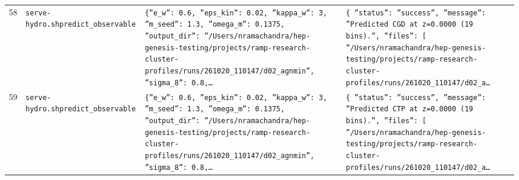 \documentclass[11pt,a4paper]{article}
\begin{document}
\begin{longtable}{@{}p{}p{}p{}p{}@{}}
58 & \texttt{serve-hydro.sh}\newline\texttt{predict\_\allowbreak{}observable} & \texttt{\{''e\_\allowbreak{}w'':\allowbreak{} 0.6,\allowbreak{} ''eps\_\allowbreak{}kin'':\allowbreak{} 0.02,\allowbreak{} ''kappa\_\allowbreak{}w'':\allowbreak{} 3,\allowbreak{} ''m\_\allowbreak{}seed'':\allowbreak{} 1.3,\allowbreak{} ''omega\_\allowbreak{}m'':\allowbreak{} 0.1375,\allowbreak{} ''output\_\allowbreak{}dir'':\allowbreak{} ''/\allowbreak{}Users/\allowbreak{}nramachandra/\allowbreak{}hep-genesis-testing/\allowbreak{}projects/\allowbreak{}ramp-research-cluster-profiles/\allowbreak{}runs/\allowbreak{}261020\_\allowbreak{}110147/\allowbreak{}d02\_\allowbreak{}agnmin'',\allowbreak{} ''sigma\_\allowbreak{}8'':\allowbreak{} 0.8,\allowbreak{}\ldots{}\allowbreak{}} & \texttt{\{   ''status'':\allowbreak{} ''success'',\allowbreak{}   ''message'':\allowbreak{} ''Predicted CGD at z=\allowbreak{}0.0000 (19 bins)\allowbreak{}.'',\allowbreak{}   ''files'':\allowbreak{} [     ''/\allowbreak{}Users/\allowbreak{}nramachandra/\allowbreak{}hep-genesis-testing/\allowbreak{}projects/\allowbreak{}ramp-research-cluster-profiles/\allowbreak{}runs/\allowbreak{}261020\_\allowbreak{}110147/\allowbreak{}d02\_\allowbreak{}a\ldots{}\allowbreak{}} \\
59 & \texttt{serve-hydro.sh}\newline\texttt{predict\_\allowbreak{}observable} & \texttt{\{''e\_\allowbreak{}w'':\allowbreak{} 0.6,\allowbreak{} ''eps\_\allowbreak{}kin'':\allowbreak{} 0.02,\allowbreak{} ''kappa\_\allowbreak{}w'':\allowbreak{} 3,\allowbreak{} ''m\_\allowbreak{}seed'':\allowbreak{} 1.3,\allowbreak{} ''omega\_\allowbreak{}m'':\allowbreak{} 0.1375,\allowbreak{} ''output\_\allowbreak{}dir'':\allowbreak{} ''/\allowbreak{}Users/\allowbreak{}nramachandra/\allowbreak{}hep-genesis-testing/\allowbreak{}projects/\allowbreak{}ramp-research-cluster-profiles/\allowbreak{}runs/\allowbreak{}261020\_\allowbreak{}110147/\allowbreak{}d02\_\allowbreak{}agnmin'',\allowbreak{} ''sigma\_\allowbreak{}8'':\allowbreak{} 0.8,\allowbreak{}\ldots{}\allowbreak{}} & \texttt{\{   ''status'':\allowbreak{} ''success'',\allowbreak{}   ''message'':\allowbreak{} ''Predicted CTP at z=\allowbreak{}0.0000 (19 bins)\allowbreak{}.'',\allowbreak{}   ''files'':\allowbreak{} [     ''/\allowbreak{}Users/\allowbreak{}nramachandra/\allowbreak{}hep-genesis-testing/\allowbreak{}projects/\allowbreak{}ramp-research-cluster-profiles/\allowbreak{}runs/\allowbreak{}261020\_\allowbreak{}110147/\allowbreak{}d02\_\allowbreak{}a\ldots{}\allowbreak{}} \\

\end{longtable}
\end{document}

